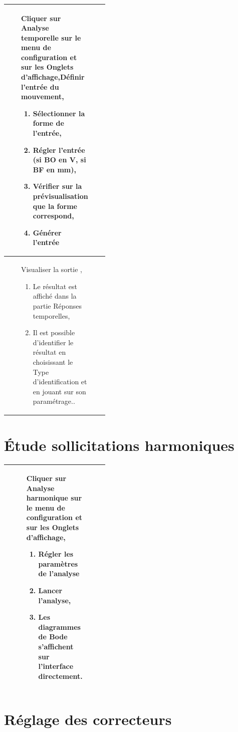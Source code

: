 \begin{tabular}{|Ep{0.4\linewidth}|p{.5\linewidth}|}
\hline
 & Cliquer sur Analyse temporelle sur le menu de configuration et sur les Onglets d'affichage,\newline Définir l'entrée du mouvement,
 \begin{enumerate}
  \item Sélectionner la forme de l'entrée,
  \item Régler l'entrée (si BO en V, si BF en mm),
  \item Vérifier sur la prévisualisation que la forme correspond,
  \item Générer l'entrée
  \end{enumerate}
&\tabularnewline\hline
& Visualiser la sortie ,
 \begin{enumerate}
  \item Le résultat est affiché dans la partie Réponses temporelles,
  \item Il est possible d'identifier le résultat en choisissant le Type d'identification et en jouant sur son paramétrage..
  \end{enumerate}
&\tabularnewline\hline
\end{tabular}

\section{Étude sollicitations harmoniques}

\setcounter{rowcounter}{1}

\begin{tabular}{|Ep{0.4\linewidth}|p{.5\linewidth}|}
\hline
 & Cliquer sur Analyse harmonique sur le menu de configuration et sur les Onglets d'affichage,
 \begin{enumerate}
  \item Régler les paramètres de l'analyse
  \item Lancer l'analyse,
  \item Les diagrammes de Bode s'affichent sur l'interface directement.
  \end{enumerate}
&\tabularnewline\hline
\end{tabular}

\section{Réglage des correcteurs}

